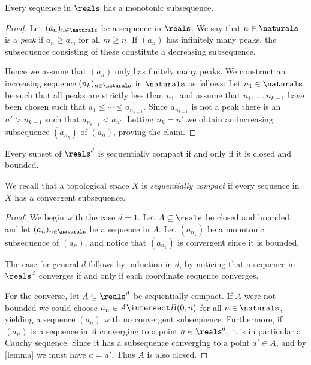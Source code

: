\documentclass[article, a4paper, 11pt, oneside]{memoir}
\numberwithin{equation}{chapter}
\begin{document}
\begin{lemma}
    Every sequence in $\reals$ has a monotonic subsequence.
\end{lemma}

\begin{proof}
    Let $(a_n)_{n\in\naturals}$ be a sequence in $\reals$. We say that $n \in \naturals$ is a \emph{peak} if $a_n \geq a_m$ for all $m \geq n$. If $(a_n)$ has infinitely many peaks, the subsequence consisting of these constitute a decreasing subsequence.

    Hence we assume that $(a_n)$ only has finitely many peaks. We construct an increasing sequence $(n_k)_{n\in\naturals}$ in $\naturals$ as follows: Let $n_1 \in \naturals$ be such that all peaks are strictly less than $n_1$, and assume that $n_1, \ldots, n_{k-1}$ have been chosen such that $a_1 \leq \cdots \leq a_{n_{k-1}}$. Since $a_{n_{k-1}}$ is not a peak there is an $n' > n_{k-1}$ such that $a_{n_{k-1}} < a_{n'}$. Letting $n_k = n'$ we obtain an increasing subsequence $(a_{n_k})$ of $(a_n)$, proving the claim.
\end{proof}

\begin{theorem}
    Every subset of $\reals^d$ is sequentially compact if and only if it is closed and bounded.
\end{theorem}
%
We recall that a topological space $X$ is \emph{sequentially compact} if every sequence in $X$ has a convergent subsequence.

\begin{proof}
    We begin with the case $d = 1$. Let $A \subseteq \reals$ be closed and bounded, and let $(a_n)_{n\in\naturals}$ be a sequence in $A$. Let $(a_{n_k})$ be a monotonic subsequence of $(a_n)$, and notice that $(a_{n_k})$ is convergent since it is bounded.

    The case for general $d$ follows by induction in $d$, by noticing that a sequence in $\reals^d$ converges if and only if each coordinate sequence converges.

    For the converse, let $A \subseteq \reals^d$ be sequentially compact. If $A$ were not bounded we could choose $a_n \in A \intersect B(0,n)$ for all $n \in \naturals$, yielding a sequence $(a_n)$ with no convergent subsequence. Furthermore, if $(a_n)$ is a sequence in $A$ converging to a point $a \in \reals^d$, it is in particular a Cauchy sequence. Since it has a subsequence converging to a point $a' \in A$, and by [lemma] we must have $a = a'$. Thus $A$ is also closed.
\end{proof}
\end{document}
